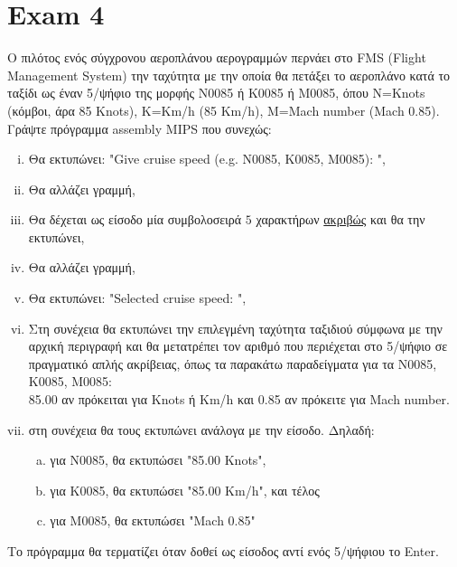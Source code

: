 \documentclass{article}
\begin{document}
\section*{Exam 4}
Ο πιλότος ενός σύγχρονου αεροπλάνου αερογραμμών περνάει στο FMS (Flight Management System)
την ταχύτητα με την οποία θα πετάξει το αεροπλάνο κατά το ταξίδι ως έναν 5/ψήφιο της μορφής
N0085 ή K0085 ή M0085, όπου N=Knots (κόμβοι, άρα 85 Knots), K=Km/h (85 Km/h),
M=Mach number (Mach 0.85).\\
Γράψτε πρόγραμμα assembly MIPS που συνεχώς:
\begin{enumerate}[i.]
    \itemsep0em
    \item Θα εκτυπώνει: "Give cruise speed (e.g. N0085, K0085, M0085): ",
    \item Θα αλλάζει γραμμή,
    \item Θα δέχεται ως είσοδο μία συμβολοσειρά $5$ χαρακτήρων \underline{ακριβώς} και θα την εκτυπώνει,
    \item Θα αλλάζει γραμμή,
    \item Θα εκτυπώνει: "Selected cruise speed: ",
    \item Στη συνέχεια θα εκτυπώνει την επιλεγμένη ταχύτητα ταξιδιού σύμφωνα με την αρχική
    περιγραφή και θα μετατρέπει τον αριθμό που περιέχεται στο 5/ψήφιο σε πραγματικό απλής
    ακρίβειας, όπως τα παρακάτω παραδείγματα για τα N0085, K0085, M0085:\\
    85.00 αν πρόκειται για Knots ή Km/h και 0.85 αν πρόκειτε για Mach number.
    \item στη συνέχεια θα τους εκτυπώνει ανάλογα με την είσοδο. Δηλαδή:
        \begin{enumerate}[a.]
            \item για N0085, θα εκτυπώσει "85.00 Knots",
            \item για K0085, θα εκτυπώσει "85.00 Km/h", και τέλος
            \item για M0085, θα εκτυπώσει "Mach 0.85"
        \end{enumerate}
\end{enumerate}
Το πρόγραμμα θα τερματίζει όταν δοθεί ως είσοδος αντί ενός 5/ψήφιου το Enter.
\end{document}

